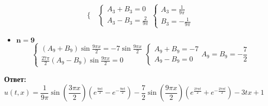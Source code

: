 \documentclass[11pt]{article}
\begin{document}
\begin{sloppypar}
\begin{itemize}
\begin{equation}
\begin{cases}
      \end{cases}
      \begin{cases}
        A_3 + B_3 = 0 \\
        A_3 - B_3 = \frac{2}{9\pi}
      \end{cases}
      \begin{cases}
        A_3 = \frac{1}{9\pi} \\
        B_3 = - \frac{1}{9\pi}
      \end{cases}
    \end{equation}
    \item $\mathbf{n = 9}$
    \begin{equation}
      \begin{cases}
        (A_9 + B_9)\sin{\frac{9\pi x}{2}} = -7\sin{\frac{9\pi x}{2}} \\
        \frac{27\pi}{2}(A_9 - B_9)\sin{\frac{9\pi x}{2}} = 0
      \end{cases}
      \begin{cases}
        A_9 + B_9 = -7 \\
        A_9 - B_9 = 0
      \end{cases}
      A_9 = B_9 = - \frac{7}{2}
    \end{equation}
  \end{itemize}
  
  \textbf{Ответ:}
  \begin{equation}
    u(t, x) = \frac{1}{9\pi} \sin{\left(\frac{3 \pi x}{2}\right)} (e^\frac{9\pi t}{2} - e^{- \frac{9\pi t}{2}}) - \frac{7}{2} \sin{\left(\frac{9 \pi x}{2}\right)}(e^\frac{27\pi t}{2} + e^{- \frac{27\pi t}{2}}) - 3tx + 1
  \end{equation}      
\end{sloppypar}
\end{document}
